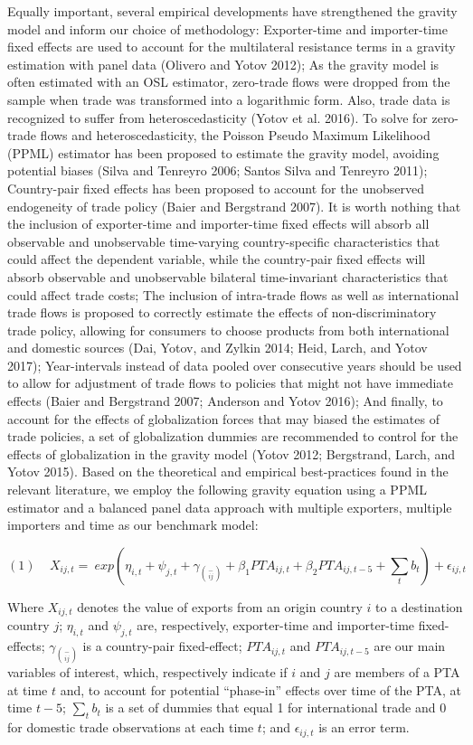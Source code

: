 Equally important, several empirical developments have strengthened the
gravity model and inform our choice of methodology: Exporter-time and
importer-time fixed effects are used to account for the multilateral
resistance terms in a gravity estimation with panel data (Olivero and
Yotov 2012); As the gravity model is often estimated with an OSL
estimator, zero-trade flows were dropped from the sample when trade was
transformed into a logarithmic form. Also, trade data is recognized to
suffer from heteroscedasticity (Yotov et al. 2016). To solve for
zero-trade flows and heteroscedasticity, the Poisson Pseudo Maximum
Likelihood (PPML) estimator has been proposed to estimate the gravity
model, avoiding potential biases (Silva and Tenreyro 2006; Santos Silva
and Tenreyro 2011); Country-pair fixed effects has been proposed to
account for the unobserved endogeneity of trade policy (Baier and
Bergstrand 2007). It is worth nothing that the inclusion of
exporter-time and importer-time fixed effects will absorb all observable
and unobservable time-varying country-specific characteristics that
could affect the dependent variable, while the country-pair fixed
effects will absorb observable and unobservable bilateral time-invariant
characteristics that could affect trade costs; The inclusion of
intra-trade flows as well as international trade flows is proposed to
correctly estimate the effects of non-discriminatory trade policy,
allowing for consumers to choose products from both international and
domestic sources (Dai, Yotov, and Zylkin 2014; Heid, Larch, and Yotov
2017); Year-intervals instead of data pooled over consecutive years
should be used to allow for adjustment of trade flows to policies that
might not have immediate effects (Baier and Bergstrand 2007; Anderson
and Yotov 2016); And finally, to account for the effects of
globalization forces that may biased the estimates of trade policies, a
set of globalization dummies are recommended to control for the effects
of globalization in the gravity model (Yotov 2012; Bergstrand, Larch,
and Yotov 2015). Based on the theoretical and empirical best-practices
found in the relevant literature, we employ the following gravity
equation using a PPML estimator and a balanced panel data approach with
multiple exporters, multiple importers and time as our benchmark model:

\[(1)\ \ \ \ \ X_{ij,t} = \ exp(\eta_{i,t} + \psi_{j,t} + \gamma_{\binom{-}{ij}} + \beta_{1}{PTA}_{ij,t} + \beta_{2}{PTA}_{ij,t - 5} + \sum_{t}^{}b_{t}) + \epsilon_{ij,t}\]

Where \(X_{ij,t}\) denotes the value of exports from an origin country
\(i\) to a destination country \(j\); \(\eta_{i,t}\) and \(\psi_{j,t}\)
are, respectively, exporter-time and importer-time fixed-effects;
\(\gamma_{\binom{-}{ij}}\) is a country-pair fixed-effect;
\({PTA}_{ij,t}\) and \({PTA}_{ij,t - 5}\) are our main variables of
interest, which, respectively indicate if \(i\) and \(j\) are members of
a PTA at time \(t\) and, to account for potential ``phase-in'' effects
over time of the PTA, at time \(t - 5\); \(\sum_{t}^{}b_{t}\) is a set
of dummies that equal 1 for international trade and 0 for domestic trade
observations at each time \(t\); and \(\epsilon_{ij,t}\) is an error
term.

